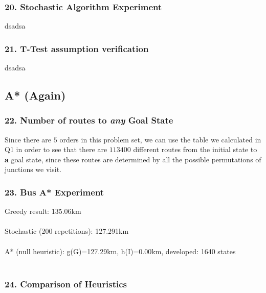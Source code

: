 \documentclass{article}
\begin{document}
\subsubsection*{20. Stochastic Algorithm Experiment}
dsadsa

\subsubsection*{21. T-Test assumption verification}
dsadsa

\subsection*{A* (Again)}
\subsubsection*{22. Number of routes to \emph{any} Goal State}
Since there are $5$ orders in this problem set, we can use the table we calculated in Q1 in order to see that there are $113400$ different routes from the initial state to \textbf{a} goal state, since these routes are determined by all the possible permutations of junctions we visit.

\subsubsection*{23. Bus A* Experiment}
Greedy result: 135.06km \\~\\
Stochastic (200 repetitions): 127.291km \\~\\
A* (null heuristic):    g(G)=127.29km, h(I)=0.00km, developed: 1640 states \\~\\

\subsubsection*{24. Comparison of Heuristics}
\end{document}

